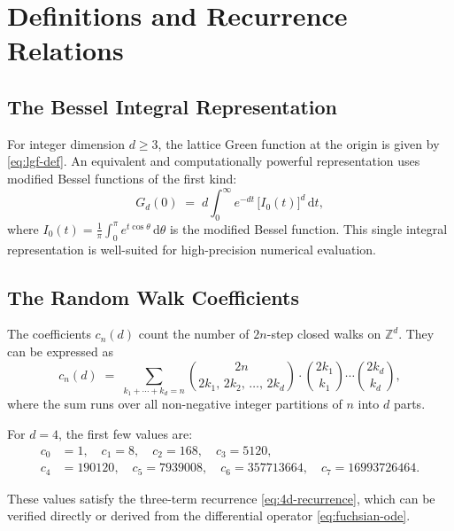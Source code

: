 \documentclass[12pt,a4paper]{article}
\numberwithin{equation}{section}
\theoremstyle{plain}
\theoremstyle{definition}
\theoremstyle{remark}
\newcommand{\Z}{\mathbb{Z}}
\newcommand{\dd}{\mathrm{d}}
\begin{document}
\section{Definitions and Recurrence Relations}

\subsection{The Bessel Integral Representation}

For integer dimension $d \geq 3$, the lattice Green function at the origin is given by \eqref{eq:lgf-def}.
An equivalent and computationally powerful representation uses modified Bessel functions of the first kind:
\begin{equation}\label{eq:bessel-integral}
  G_d(0) \;=\; d\int_0^\infty e^{-dt}\,\bigl[I_0(t)\bigr]^d \,\dd t,
\end{equation}
where $I_0(t) = \frac{1}{\pi}\int_0^\pi e^{t\cos\theta}\,\dd\theta$ is the modified Bessel function.
This single integral representation is well-suited for high-precision numerical evaluation.

\subsection{The Random Walk Coefficients}

The coefficients $c_n(d)$ count the number of $2n$-step closed walks on $\Z^d$. They can be expressed as
\begin{equation}\label{eq:cn-def}
  c_n(d) \;=\; \sum_{k_1 + \cdots + k_d = n} \binom{2n}{2k_1,\,2k_2,\,\ldots,\,2k_d} \cdot \binom{2k_1}{k_1} \cdots \binom{2k_d}{k_d},
\end{equation}
where the sum runs over all non-negative integer partitions of $n$ into $d$ parts.

For $d = 4$, the first few values are:
\begin{equation}\label{eq:4d-cn-values}
\begin{aligned}
  c_0 &= 1, \quad c_1 = 8, \quad c_2 = 168, \quad c_3 = 5120, \\
  c_4 &= 190120, \quad c_5 = 7939008, \quad c_6 = 357713664, \quad c_7 = 16993726464.
\end{aligned}
\end{equation}

These values satisfy the three-term recurrence \eqref{eq:4d-recurrence}, which can be verified directly
or derived from the differential operator \eqref{eq:fuchsian-ode}.
\end{document}
